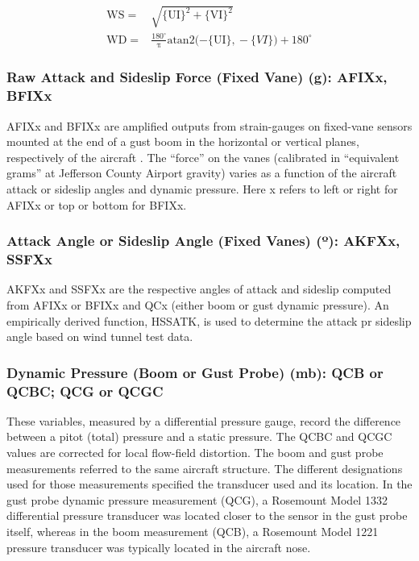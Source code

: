 \documentclass[
  english,
]{book}
\begin{document}
\begin{align}
\mathrm{WS} = & \sqrt{\mathrm{\{UI\}^{2}+\{VI\}^{2}}} \label{eq:WSobs}\\
\mathrm{WD} = & \mathrm{\frac{180^{\circ}}{\pi}atan2(-\{UI\},}-\{VI\})+180^{\circ}
\label{eq:WDobs}
\end{align}

\hypertarget{vanes}{%
\subsubsection*{Raw Attack and Sideslip Force (Fixed Vane) (g): AFIXx, BFIXx}\label{vanes}}

AFIXx and BFIXx are amplified outputs from strain-gauges on fixed-vane sensors mounted at the end of a gust boom in the horizontal or vertical planes, respectively of the aircraft . The ``force'' on the vanes (calibrated in ``equivalent grams'' at Jefferson County Airport gravity) varies as a function of the aircraft attack or sideslip angles and dynamic pressure. Here x refers to left or right for AFIXx or top or bottom for BFIXx.

\hypertarget{akfxx}{%
\subsubsection*{\texorpdfstring{Attack Angle or Sideslip Angle (Fixed Vanes) ({º}): AKFXx, SSFXx}{Attack Angle or Sideslip Angle (Fixed Vanes) (º): AKFXx, SSFXx}}\label{akfxx}}

AKFXx and SSFXx are the respective angles of attack and sideslip computed from AFIXx or BFIXx and QCx (either boom or gust dynamic pressure). An empirically derived function, HSSATK, is used to determine the attack pr sideslip angle based on wind tunnel test data.

\hypertarget{qcb}{%
\subsubsection*{Dynamic Pressure (Boom or Gust Probe) (mb): QCB or QCBC; QCG or QCGC}\label{qcb}}

These variables, measured by a differential pressure gauge, record the difference between a pitot (total) pressure and a static pressure. The QCBC and QCGC values are corrected for local flow-field distortion. The boom and gust probe measurements referred to the same aircraft structure. The different designations used for those measurements specified the transducer used and its location. In the gust probe dynamic pressure measurement (QCG), a Rosemount Model 1332 differential pressure transducer was located closer to the sensor in the gust probe itself, whereas in the boom measurement (QCB), a Rosemount Model 1221 pressure transducer was typically located in the aircraft nose.
\end{document}
